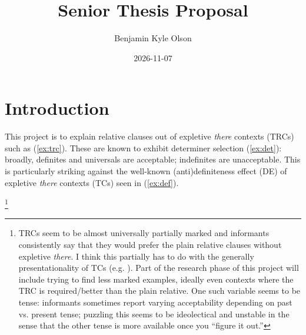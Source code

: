 \documentclass[11pt]{article}
\title{Senior Thesis Proposal}
\author{Benjamin Kyle Olson}
\date{2026-11-07}
\begin{document}
\maketitle

\section{Introduction}

This project is to explain relative clauses out of expletive \textit{there} contexts (TRCs) such as (\ref{ex:trc}). These are known to exhibit determiner selection (\ref{ex:det}): broadly, definites and universals are acceptable; indefinites are unacceptable. This is particularly striking against the well-known (anti)definiteness effect (DE) of expletive \textit{there} contexts (TCs) seen in (\ref{ex:def}).

\begin{exe}
	\label{ex:trc}\footnote{\label{fn:intro}TRCs seem to be almost universally partially marked and informants consistently say that they would prefer the plain relative clauses without expletive \textit{there}. I think this partially has to do with the generally presentationality of TCs (e.g. \cite{zucchiIngredientsDefinitenessDefiniteness1995}). Part of the research phase of this project will include trying to find less marked examples, ideally even contexts where the TRC is required/better than the plain relative. One such variable seems to be tense: informants sometimes report varying acceptability depending on past vs. present tense; puzzling this seems to be ideolectical and unstable in the sense that the other tense is more available once you ``figure it out.''}
	\label{ex:det}
	\label{ex:def}
\end{exe}
\end{document}
